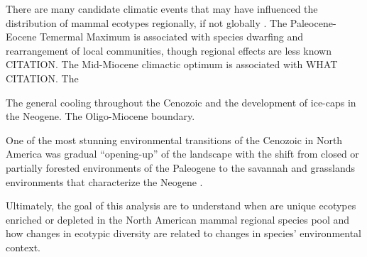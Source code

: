 \documentclass[12pt,letterpaper]{article}
\begin{document}
There are many candidate climatic events that may have influenced the distribution of mammal ecotypes regionally, if not globally \citep{Zachos2001,Zachos2008,Janis1993b,Blois2009}. The Paleocene-Eocene Temermal Maximum is associated with species dwarfing and rearrangement of local communities, though regional effects are less known CITATION. The Mid-Miocene climactic optimum is associated with WHAT CITATION. The 

The general cooling throughout the Cenozoic and the development of ice-caps in the Neogene. The Oligo-Miocene boundary. 

One of the most stunning environmental transitions of the Cenozoic in North America was gradual ``opening-up'' of the landscape with the shift from closed or partially forested environments of the Paleogene to the savannah and grasslands environments that characterize the Neogene \citep{Blois2009,Janis1993b,Janis2000,Stromberg2005}.










Ultimately, the goal of this analysis are to understand when are unique ecotypes enriched or depleted in the North American mammal regional species pool and how changes in ecotypic diversity are related to changes in species' environmental context.
\end{document}

